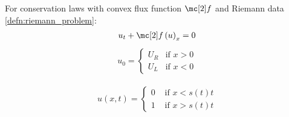 \begin{defnbox}\nospacing
    \begin{defn}\label{defn:riemann_shock_waves}
        For conservation laws with convex flux function $\flux$ and Riemann data \cref{defn:riemann_problem}:
            \begin{align}
            u_{t}+\flux \left(u\right)_{x}=0
            \end{align}
            \begin{align}
            u_{0}=\begin{cases}
                    U_{R}&\text{if }x>0\\
                    U_{L}&\text{if }x<0
                    \end{cases}
            \end{align}
    \end{defn}
\end{defnbox}
\begin{corbox}\nospacing
    \begin{cor}\label{cor:shock_wave_solution}
        \begin{align}
          u(x,t)=
          \begin{cases}
              0&\text{ if }x<s(t)t\\
              1&\text{ if }x>s(t)t
          \end{cases}
        \end{align}
    \end{cor}
\end{corbox}

